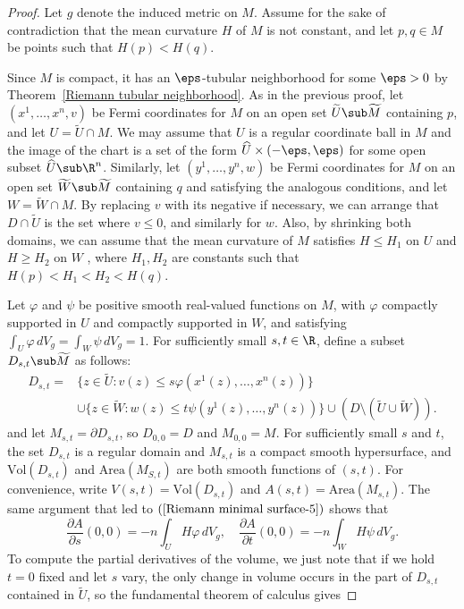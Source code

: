 \begin{proof}
Let $g$ denote the induced metric on $M$. Assume for the sake of contradiction that the mean curvature $H$ of $M$ is not constant, and let $p,q\in M$ be points such 
that $H(p)<H(q)$.\par
Since $M$ is compact, it has an $\eps$-tubular neighborhood for some $\eps>0$ by Theorem~\ref{Riemann tubular neighborhood}. As in the previous proof, let $(x^1,\dots,x^n,v)$ be Fermi coordinates for $M$ on an open set $\widetilde{U}\sub\widetilde{M}$ containing $p$, and let $U=\widetilde{U}\cap M$. We may assume that $U$ is a regular coordinate ball in $M$ and the image of the chart is a set of the form $\widehat{U}\times(-\eps,\eps)$ for some open subset $\widehat{U}\sub\R^n$. Similarly, let $(y^1,\dots,y^n,w)$ be Fermi coordinates for $M$ on an open set $\widetilde{W}\sub\widetilde{M}$ containing $q$ and satisfying the analogous conditions, and let $W=\widetilde{W}\cap M$. By replacing $v$ with its negative if necessary, we can arrange that $D\cap\widetilde{U}$ is the set where $v\leq 0$, and similarly for $w$. Also, by shrinking both domains, we can assume that the mean curvature of $M$ satisfies $H\leq H_1$ on $U$ and $H\geq H_2$ on $W$ , where $H_1,H_2$ are constants such that $H(p)<H_1<H_2<H(q)$.\par
Let $\varphi$ and $\psi$ be positive smooth real-valued functions on $M$, with $\varphi$ compactly supported in $U$ and compactly supported in $W$, and satisfying $\int_U\varphi\,dV_g=\int_W\psi\,dV_g=1$. For sufficiently small $s,t\in\R$, define a subset $D_{s,t}\sub\widetilde{M}$ as follows:
\begin{align*}
D_{s,t}=&\{z\in\widetilde{U}:v(z)\leq s\varphi(x^1(z),\dots,x^n(z))\}\\
&\cup\{z\in\widetilde{W}:w(z)\leq t\psi(y^1(z),\dots,y^n(z))\}\cup(D\setminus(\widetilde{U}\cup\widetilde{W})).
\end{align*}
and let $M_{s,t}=\partial D_{s,t}$, so $D_{0,0}=D$ and $M_{0,0}=M$. For sufficiently small $s$ and $t$, the set $D_{s,t}$ is a regular domain and $M_{s,t}$ is a compact smooth hypersurface, and $\mathrm{Vol}(D_{s,t})$ and $\mathrm{Area}(M_{S,t})$ are both smooth functions of $(s,t)$. For convenience, write $V(s,t)=\mathrm{Vol}(D_{s,t})$ and $A(s,t)=\mathrm{Area}(M_{s,t})$. The same argument that led to $(\ref{Riemann minimal surface-5})$ shows that
\[\frac{\partial A}{\partial s}(0,0)=-n\int_UH\varphi\,dV_g,\quad\frac{\partial A}{\partial t}(0,0)=-n\int_WH\psi\,dV_g.\]
To compute the partial derivatives of the volume, we just note that if we hold $t=0$ fixed and let $s$ vary, the only change in volume occurs in the part of $D_{s,t}$ contained in $\widetilde{U}$, so the fundamental theorem of calculus gives

\end{proof}
